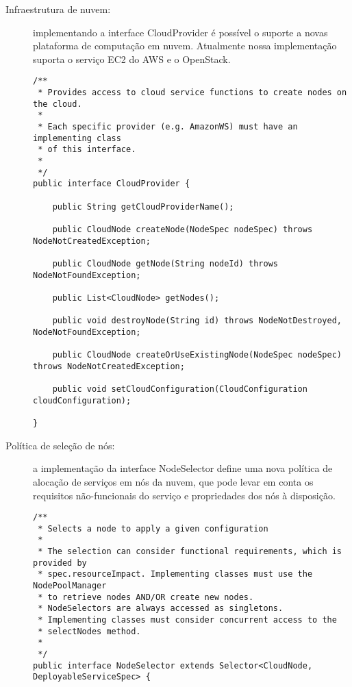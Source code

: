 \begin{description}

\item [Infraestrutura de nuvem:] implementando a interface \textsf{CloudProvider} é possível o suporte a novas plataforma de computação em nuvem. Atualmente nossa implementação suporta o serviço EC2 do AWS e o OpenStack.

\begin{lstlisting}[frame=trbl, label=lst:cloud_provider, caption=Interface CloudProvider.]
/**
 * Provides access to cloud service functions to create nodes on the cloud.
 * 
 * Each specific provider (e.g. AmazonWS) must have an implementing class 
 * of this interface.
 * 
 */
public interface CloudProvider {

    public String getCloudProviderName();

    public CloudNode createNode(NodeSpec nodeSpec) throws NodeNotCreatedException;

    public CloudNode getNode(String nodeId) throws NodeNotFoundException;

    public List<CloudNode> getNodes();

    public void destroyNode(String id) throws NodeNotDestroyed, NodeNotFoundException;

    public CloudNode createOrUseExistingNode(NodeSpec nodeSpec) throws NodeNotCreatedException;

    public void setCloudConfiguration(CloudConfiguration cloudConfiguration);

}
\end{lstlisting}



\item [Política de seleção de nós:] a implementação da interface \textsf{NodeSelector} define uma nova política de alocação de serviços em nós da nuvem, que pode levar em conta os requisitos não-funcionais do serviço e propriedades dos nós à disposição.

\begin{lstlisting}[frame=trbl, label=lst:node_selector, caption=Interface NodeSelector acompanhada de sua classe pai Selector.]
/**
 * Selects a node to apply a given configuration
 * 
 * The selection can consider functional requirements, which is provided by
 * spec.resourceImpact. Implementing classes must use the NodePoolManager 
 * to retrieve nodes AND/OR create new nodes. 
 * NodeSelectors are always accessed as singletons. 
 * Implementing classes must consider concurrent access to the
 * selectNodes method.
 *  
 */
public interface NodeSelector extends Selector<CloudNode, DeployableServiceSpec> {


\end{lstlisting}
\end{description}
